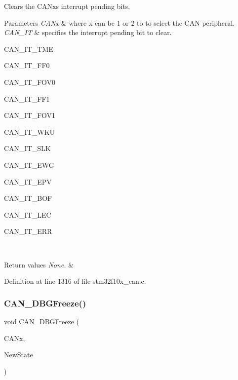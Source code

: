 Clears the C\+A\+Nx\textquotesingle{}s interrupt pending bits. 


\begin{DoxyParams}{Parameters}
{\em C\+A\+Nx} & where x can be 1 or 2 to to select the C\+AN peripheral. \\
\hline
{\em C\+A\+N\+\_\+\+IT} & specifies the interrupt pending bit to clear.
\begin{DoxyItemize}
\item C\+A\+N\+\_\+\+I\+T\+\_\+\+T\+ME
\item C\+A\+N\+\_\+\+I\+T\+\_\+\+F\+F0
\item C\+A\+N\+\_\+\+I\+T\+\_\+\+F\+O\+V0
\item C\+A\+N\+\_\+\+I\+T\+\_\+\+F\+F1
\item C\+A\+N\+\_\+\+I\+T\+\_\+\+F\+O\+V1
\item C\+A\+N\+\_\+\+I\+T\+\_\+\+W\+KU
\item C\+A\+N\+\_\+\+I\+T\+\_\+\+S\+LK
\item C\+A\+N\+\_\+\+I\+T\+\_\+\+E\+WG
\item C\+A\+N\+\_\+\+I\+T\+\_\+\+E\+PV
\item C\+A\+N\+\_\+\+I\+T\+\_\+\+B\+OF
\item C\+A\+N\+\_\+\+I\+T\+\_\+\+L\+EC
\item C\+A\+N\+\_\+\+I\+T\+\_\+\+E\+RR 
\end{DoxyItemize}\\
\hline
\end{DoxyParams}

\begin{DoxyRetVals}{Return values}
{\em None.} & \\
\hline
\end{DoxyRetVals}


Definition at line 1316 of file stm32f10x\+\_\+can.\+c.

\mbox{\label{group___c_a_n___exported___functions_gac0e2d33e08caf49d1f1251f0dcc20213}} 
\subsubsection{\texorpdfstring{C\+A\+N\+\_\+\+D\+B\+G\+Freeze()}{CAN\_DBGFreeze()}}
{\footnotesize\ttfamily void C\+A\+N\+\_\+\+D\+B\+G\+Freeze (\begin{DoxyParamCaption}\item[{\hyperlink{struct_c_a_n___type_def}{C\+A\+N\+\_\+\+Type\+Def} $\ast$}]{C\+A\+Nx,  }\item[{\hyperlink{group___exported__types_gac9a7e9a35d2513ec15c3b537aaa4fba1}{Functional\+State}}]{New\+State }\end{DoxyParamCaption})}



